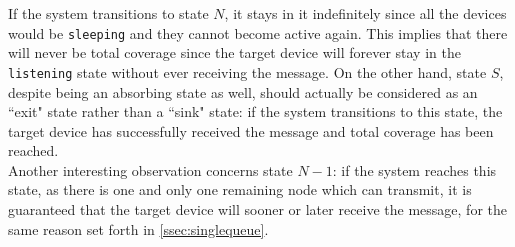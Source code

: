 If the system transitions to state $N$, it stays in it indefinitely since all
the devices would be \texttt{sleeping} and they cannot become active again. This
implies that there will never be total coverage since the target device will
forever stay in the \texttt{listening} state without ever receiving the message.
On the other hand, state $S$, despite being an absorbing state as well, should
actually be considered as an ``exit" state rather than a ``sink" state: if the
system transitions to this state, the target device has successfully received
the message and total coverage has been reached.\\
Another interesting observation concerns state $N - 1$: if the system reaches
this state, as there is one and only one remaining node which can transmit, it
is guaranteed that the target device will sooner or later receive the message,
for the same reason set forth in \ref{ssec:singlequeue}.
